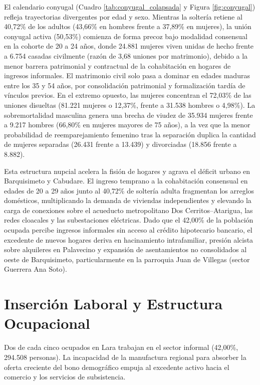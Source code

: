\documentclass[12pt,letterpaper]{article}
\begin{document}
El calendario conyugal (Cuadro \ref{tab:conyugal_colapsada} y Figura \ref{fig:conyugal}) refleja trayectorias divergentes por edad y sexo. Mientras la soltería retiene al 40,72\% de los adultos (43,66\% en hombres frente a 37,89\% en mujeres), la unión conyugal activa (50,53\%) comienza de forma precoz bajo modalidad consensual en la cohorte de 20 a 24 años, donde 24.881 mujeres viven unidas de hecho frente a 6.754 casadas civilmente (razón de 3,68 uniones por matrimonio), debido a la menor barrera patrimonial y contractual de la cohabitación en hogares de ingresos informales. El matrimonio civil solo pasa a dominar en edades maduras entre los 35 y 54 años, por consolidación patrimonial y formalización tardía de vínculos previos. En el extremo opuesto, las mujeres concentran el 72,03\% de las uniones disueltas (81.221 mujeres o 12,37\%, frente a 31.538 hombres o 4,98\%). La sobremortalidad masculina genera una brecha de viudez de 35.934 mujeres frente a 9.217 hombres (66,80\% en mujeres mayores de 75 años), a la vez que la menor probabilidad de reemparejamiento femenino tras la separación duplica la cantidad de mujeres separadas (26.431 frente a 13.439) y divorciadas (18.856 frente a 8.882).

Esta estructura nupcial acelera la fisión de hogares y agrava el déficit urbano en Barquisimeto y Cabudare. El ingreso temprano a la cohabitación consensual en edades de 20 a 29 años junto al 40,72\% de soltería adulta fragmentan los arreglos domésticos, multiplicando la demanda de viviendas independientes y elevando la carga de conexiones sobre el acueducto metropolitano Dos Cerritos--Atarigua, las redes cloacales y las subestaciones eléctricas. Dado que el 42,00\% de la población ocupada percibe ingresos informales sin acceso al crédito hipotecario bancario, el excedente de nuevos hogares deriva en hacinamiento intrafamiliar, presión alcista sobre alquileres en Palavecino y expansión de asentamientos no consolidados al oeste de Barquisimeto, particularmente en la parroquia Juan de Villegas (sector Guerrera Ana Soto).

\section{Inserción Laboral y Estructura Ocupacional}

Dos de cada cinco ocupados en Lara trabajan en el sector informal (42,00\%, 294.508 personas). La incapacidad de la manufactura regional para absorber la oferta creciente del bono demográfico empuja al excedente activo hacia el comercio y los servicios de subsistencia.
\end{document}
